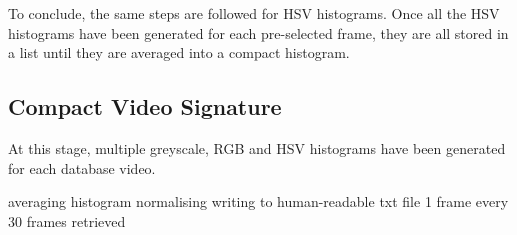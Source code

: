 To conclude, the same steps are followed for HSV histograms. Once all the HSV histograms have been generated for each pre-selected frame, they are all stored in a list until they are averaged into a compact histogram.



\subsection{Compact Video Signature}

At this stage, multiple greyscale, RGB and HSV histograms have been generated for each database video. 

averaging histogram
normalising
writing to human-readable txt file
1 frame every 30 frames retrieved






